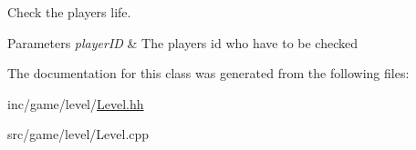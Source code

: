 Check the player\textquotesingle{}s life. 


\begin{DoxyParams}{Parameters}
{\em player\+ID} & The player\textquotesingle{}s id who have to be checked \\
\hline
\end{DoxyParams}


The documentation for this class was generated from the following files\+:\begin{DoxyCompactItemize}
\item 
inc/game/level/\hyperlink{Level_8hh}{Level.\+hh}\item 
src/game/level/Level.\+cpp\end{DoxyCompactItemize}
